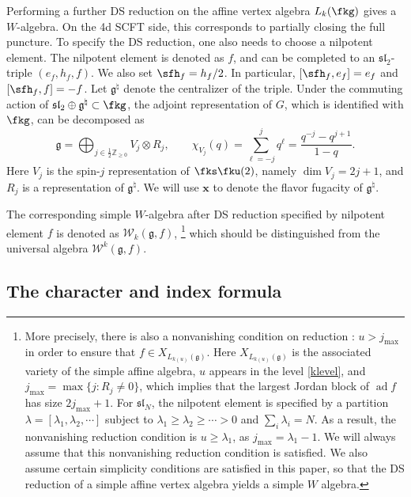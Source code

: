 \documentclass[a4paper,11pt]{article}
\theoremstyle{definition}
\theoremstyle{definition}
\theoremstyle{remark}
\newcommand{\be}{\begin{equation}}
\newcommand{\ee}{\end{equation}}
\begin{document}
Performing a further DS reduction on the affine vertex algebra $L_k(\fkg)$ gives a $W$-algebra.   On the 4d SCFT side, this corresponds to partially closing the full puncture.  To specify the DS reduction, one also needs to choose a nilpotent element.  The nilpotent element 
is denoted as $f$, and can be completed to an $\mathfrak{sl}_2$-triple
$(e_f,h_f,f)$. We also set $\sfh_f=h_f/2$.
In particular, $[\sfh_f,e_f]=e_f$ and $[\sfh_f,f]=-f$.
%
Let $\mathfrak g^\natural$ denote the centralizer of the triple. 
Under  the commuting action of $ \mathfrak{sl}_2\oplus\mathfrak g^\natural\subset \fkg $, the adjoint representation of $G$, which is identified with    $\fkg$,  can be decomposed as
\be
 \mathfrak g=\bigoplus_{j\in\frac12\mathbb Z_{\geq0}}
 V_j\otimes R_j,\qquad
 \chi_{V_j}(q)=\sum_{\ell=-j}^{j}q^\ell
 =\frac{q^{-j}-q^{j+1}}{1-q}.
 \label{gw-eq-decomposition}
\ee
%
Here $V_j$ is the spin-$j$ representation of $\fks\fku(2)$, namely $\dim V_j=2j+1$,  and $R_j$ is a representation of
$\mathfrak g^\natural$.  We will use  $\bm x$ to denote the flavor fugacity of   $\mathfrak g^\natural$.  

  

 The corresponding simple  $W$-algebra after DS reduction specified by nilpotent element $f$ is denoted as $\mathcal W_k(\mathfrak g,f)$, \footnote{More precisely, there is also a nonvanishing condition on reduction \cite{Arakawa:2010ni}: $u>j_{\text{max}}$ in order to ensure that    $f\in X_{L_{k(u)}(\mathfrak g)}$. Here  $ X_{L_{k(u)}(\mathfrak g)}$ is the associated variety  of the simple affine algebra, $u$ appears in the level \eqref{klevel}, and $j_{\text{max}}=\max\{j:R_j\neq0\}$, which implies that the largest Jordan block of  $\operatorname{ad}f$ has size $2j_{\text{max}}+1$. 
For $\mathfrak{sl}_N$, the nilpotent element is specified by  a partition  $\lambda=[\lambda_1,\lambda_2, \cdots]$ subject to  $\lambda_1\ge \lambda_2\ge\cdots > 0$ and $\sum_i \lambda_i=N$. As a result, the   nonvanishing reduction condition is
  $u\geq \lambda_1$, as $j_{\max}=\lambda_1-1$. We will always assume that this nonvanishing     reduction condition is satisfied.  
  We also assume certain simplicity conditions are satisfied in this paper, so that the DS reduction  of a simple affine vertex algebra  yields  a simple $W$ algebra.  
  } which should be distinguished from the  universal algebra $\mathcal W^k(\mathfrak g,f)$.


\subsection{The character and index formula}
\end{document}
